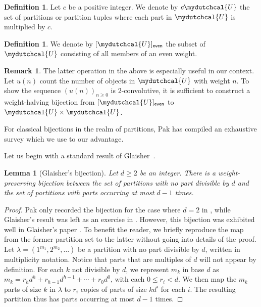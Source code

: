 \documentclass[12pt,reqno]{amsart}
\numberwithin{equation}{section}
\theoremstyle{plain}
\newtheorem{lemma}[theorem]{Lemma}
\theoremstyle{definition}
\newtheorem{definition}[theorem]{Definition}
\newtheorem{remark}[theorem]{Remark}
\theoremstyle{named}
\newcommand{\cU}{\mydutchcal{U}}
\newcommand{\even}{\mathsf{even}}
\begin{document}
\begin{definition}
	Let $c$ be a positive integer. We denote by $c\cU$ the set of partitions or partition tuples where each part in $\cU$ is multiplied by $c$.
\end{definition}

\begin{definition}
	We denote by $[\cU]_\even$ the subset of $\cU$ consisting of all members of an even weight.
\end{definition}

\begin{remark}\label{rmk:weight-halving}
	The latter operation in the above is especially useful in our context. Let $u(n)$ count the number of objects in $\cU$ with weight $n$. To show the sequence $(u(n))_{n\ge 0}$ is $2$-convolutive, it is sufficient to construct a weight-halving bijection from $[\cU]_\even$ to $\cU\times \cU$.
\end{remark}

For classical bijections in the realm of partitions, Pak has compiled an exhaustive survey \cite{Pak2006} which we use to our advantage.

Let us begin with a standard result of Glaisher~\cite[p.~163]{Gla1883}.

\begin{lemma}[Glaisher's bijection]\label{le:Glaisher-bij}
	Let $d\ge 2$ be an integer. There is a weight-preserving bijection between the set of partitions with no part divisible by $d$ and the set of partitions with parts occurring at most $d-1$ times.
\end{lemma}

\begin{proof}
	Pak only recorded the bijection for the case where $d=2$ in \cite[p.~23, Sect.~3.2.1]{Pak2006}, while Glaisher's result was left as an exercise in \cite[p.~23, Sect.~3.2.3]{Pak2006}. However, this bijection was exhibited well in Glaisher's paper \cite[p.~162]{Gla1883}. To benefit the reader, we briefly reproduce the map from the former partition set to the latter without going into details of the proof. Let $\lambda = (1^{m_1},2^{m_2},\ldots)$ be a partition with no part divisible by $d$, written in multiplicity notation. Notice that parts that are multiples of $d$ will not appear by definition. For each $k$ not divisible by $d$, we represent $m_k$ in base $d$ as $m_k = r_hd^h + r_{h-1}d^{h-1} + \cdots + r_0d^0$, with each $0\le r_i< d$. We then map the $m_k$ parts of size $k$ in $\lambda$ to $r_i$ copies of parts of size $k d^i$ for each $i$. 
    The resulting partition thus has parts occurring at most $d-1$ times.
\end{proof}
\end{document}
